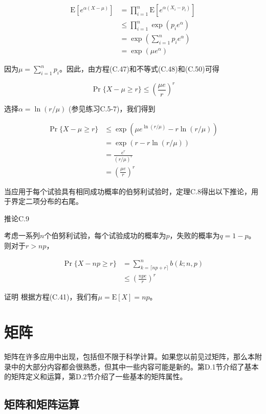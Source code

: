 \documentclass[lang=cn,newtx,10pt,scheme=chinese]{elegantbook}
\begin{document}
$$
\begin{aligned}
\mathrm{E}\left[e^{\alpha(X-\mu)}\right] & =\prod_{i=1}^n \mathrm{E}\left[e^{\alpha\left(X_i-p_i\right)}\right] \\
& \leq \prod_{i=1}^n \exp \left(p_i e^\alpha\right) \\
& =\exp \left(\sum_{i=1}^n p_i e^\alpha\right) \\
& =\exp \left(\mu e^\alpha\right)
\end{aligned}
$$

因为$\mu=\sum_{i=1}^n p_i$。因此，由方程(C.47)和不等式(C.48)和(C.50)可得

$$
\operatorname{Pr}\{X-\mu \geq r\} \leq \left(\frac{\mu e}{r}\right)^r
$$

选择$\alpha=\ln (r / \mu)$ (参见练习C.5-7)，我们得到

$$
\begin{aligned}
\operatorname{Pr}\{X-\mu \geq r\} & \leq \exp \left(\mu e^{\ln (r / \mu)}-r \ln (r / \mu)\right) \\
& =\exp (r-r \ln (r / \mu)) \\
& =\frac{e^r}{(r / \mu)^r} \\
& =\left(\frac{\mu e}{r}\right)^r
\end{aligned}
$$

当应用于每个试验具有相同成功概率的伯努利试验时，定理C.8得出以下推论，用于界定二项分布的右尾。

推论C.9

考虑一系列$n$个伯努利试验，每个试验成功的概率为$p$，失败的概率为$q=1-p$。则对于$r>n p$，

$$
\begin{aligned}
\operatorname{Pr}\{X-n p \geq r\} & =\sum_{k=\lceil n p+r\rceil}^n b(k ; n, p) \\
& \leq\left(\frac{n p e}{r}\right)^r
\end{aligned}
$$

证明 根据方程(C.41)，我们有$\mu=\mathrm{E}[X]=n p$。

\chapter{矩阵}

矩阵在许多应用中出现，包括但不限于科学计算。如果您以前见过矩阵，那么本附录中的大部分内容都会很熟悉，但其中一些内容可能是新的。第D.1节介绍了基本的矩阵定义和运算，第D.2节介绍了一些基本的矩阵属性。

\section{矩阵和矩阵运算}
\end{document}

